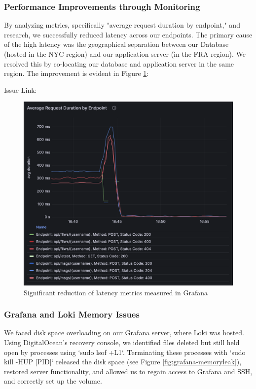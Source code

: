 \subsubsection{Performance Improvements through Monitoring}
By analyzing metrics, specifically "average request duration by endpoint," and research, we successfully reduced latency across our endpoints. The primary cause of the high latency was the geographical separation between our Database (hosted in the NYC region) and our application server (in the FRA region). We resolved this by co-locating our database and application server in the same region. The improvement is evident in Figure \ref{fig:grafana-endpoints-latency}:

Issue Link:

\begin{figure}[H]
\centering
\includegraphics[height=0.9\textwidth]{images/grafana-endpoints-latency.png}
\caption{Significant reduction of latency metrics measured in Grafana}
\label{fig:grafana-endpoints-latency}
\end{figure}

\subsubsection{Grafana and Loki Memory Issues}
We faced disk space overloading on our Grafana server, where Loki was hosted. Using DigitalOcean's recovery console, we identified files deleted but still held open by processes using `sudo lsof +L1`. Terminating these processes with `sudo kill -HUP [PID]` released the disk space (see Figure \ref{fig:grafana-memoryleak}), restored server functionality, and allowed us to regain access to Grafana and SSH, and correctly set up the volume.


